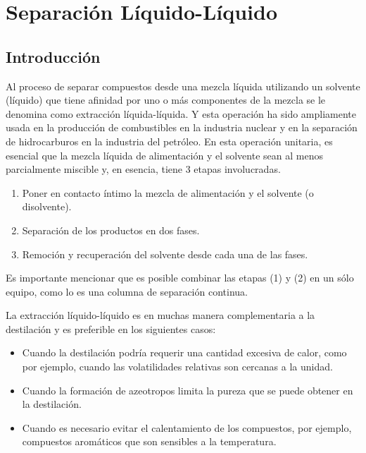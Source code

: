 \documentclass[11pt]{book}
\begin{document}
\chapter{Separación Líquido-Líquido}

\section{Introducción}

Al proceso de separar compuestos desde una mezcla líquida utilizando un solvente (líquido) que tiene afinidad por uno o más componentes de la mezcla se le denomina como extracción líquida-líquida. Y esta operación ha sido ampliamente usada en la producción de combustibles en la industria nuclear y en la separación de hidrocarburos en la industria del petróleo. En esta operación unitaria, es esencial que la mezcla líquida de alimentación y el solvente sean al menos parcialmente miscible y, en esencia, tiene 3 etapas involucradas.

\begin{enumerate}
    \item Poner en contacto íntimo la mezcla de alimentación y el solvente (o disolvente).
    
    \item Separación de los productos en dos fases.
    
    \item Remoción y recuperación del solvente desde cada una de las fases.
\end{enumerate}

Es importante mencionar que es posible combinar las etapas (1) y (2) en un sólo equipo, como lo es una columna de separación continua. 

La extracción líquido-líquido es en muchas manera complementaria a la destilación y es preferible en los siguientes casos:

\begin{itemize}
    \item Cuando la destilación podría requerir una cantidad excesiva de calor, como por ejemplo, cuando las volatilidades relativas son cercanas a la unidad.
    
    \item Cuando la formación de azeotropos limita la pureza que se puede obtener en la destilación.
    
    \item Cuando es necesario evitar el calentamiento de los compuestos, por ejemplo, compuestos aromáticos que son sensibles a la temperatura.
\end{itemize}
\end{document}
